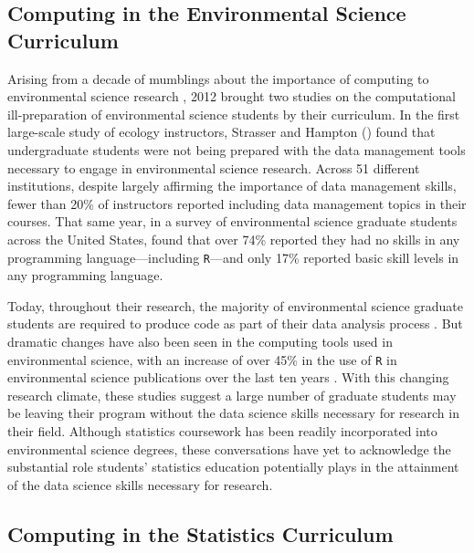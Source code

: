 \documentclass[12pt]{article}
\begin{document}
\subsection{Computing in the Environmental Science Curriculum}

\noindent Arising from a decade of mumblings about the importance of computing to 
environmental science research \citep{andelman, dodds1, dodds2, eglen, 
green, hastings, kelling, wilson-software-carpentry, wilson, wing}, 2012 brought
two studies on the computational ill-preparation of environmental science 
students by their curriculum. In the first large-scale study of ecology
instructors, Strasser and Hampton (\citeyear{labs}) found that undergraduate
students were not being prepared with the data management tools necessary to
engage in environmental science research. Across 51 different institutions,
despite largely affirming the importance of data management skills, fewer than
20\% of instructors reported including data management topics in their courses. 
That same year, in a survey of environmental science graduate students across
the United States, \citet{hernandez} found that over 74\% reported they had no
skills in any programming language---including \texttt{R}---and only
17\% reported basic skill levels in any programming language. 

\quad Today, throughout their research, the majority of environmental science
graduate students are required to produce code as part of their data analysis
process \citep{mislan}. But dramatic changes have also been seen in the 
computing tools used in environmental science, with an increase of over 45\% in
the use of \texttt{R} in environmental science publications over the last ten 
years \citep{Rpopular}. With this changing research climate, these studies
suggest a large number of graduate students may be leaving their program without
the data science skills necessary for research in their field. Although 
statistics coursework has been readily incorporated into environmental science
degrees, these conversations have yet to acknowledge the substantial role
students' statistics education potentially plays in the attainment of the data
science skills necessary for research.


\subsection{Computing in the Statistics Curriculum}
\end{document}
